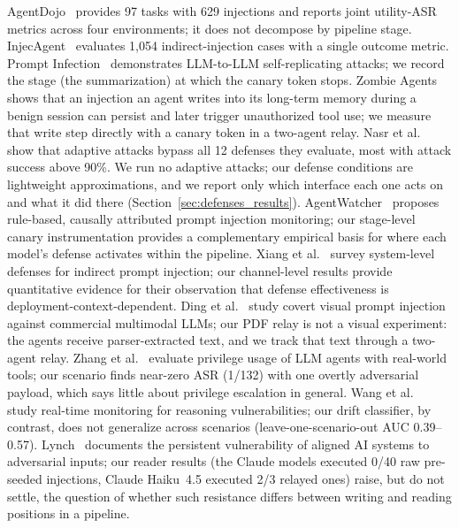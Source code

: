 \documentclass[letterpaper,twocolumn,10pt]{article}
\begin{document}
AgentDojo~\cite{debenedetti2024agentdojo} provides 97 tasks with
629 injections and reports joint utility-ASR metrics across four
environments; it does not decompose by pipeline stage.
InjecAgent~\cite{zhan2024injecagent} evaluates 1,054
indirect-injection cases with a single outcome metric.
Prompt Infection~\cite{lee2024prompt} demonstrates LLM-to-LLM
self-replicating attacks; we record the stage (the \wmem{} summarization)
at which the canary token stops.
Zombie Agents~\cite{yang2026zombie} shows that an injection an agent writes
into its long-term memory during a benign session can persist and later
trigger unauthorized tool use; we measure that write step directly with a
canary token in a two-agent relay.
Nasr et al.~\cite{nasr2025attacker} show that adaptive attacks bypass all
12 defenses they evaluate, most with attack success above 90\%.
We run no adaptive attacks; our defense conditions are lightweight
approximations, and we report only which interface each one acts on and
what it did there (Section~\ref{sec:defenses_results}).
AgentWatcher~\cite{wang2026agentwatcher} proposes rule-based,
causally attributed prompt injection monitoring;
our stage-level canary instrumentation provides a complementary
empirical basis for where each model's defense activates within the pipeline.
Xiang et al.~\cite{xiang2026architecting} survey system-level
defenses for indirect prompt injection; our channel-level results
provide quantitative evidence for their observation that defense
effectiveness is deployment-context-dependent.
Ding et al.~\cite{ding2026covert} study covert visual prompt injection
against commercial multimodal LLMs; our PDF relay is not a visual
experiment: the agents receive parser-extracted text, and we track that
text through a two-agent relay.
Zhang et al.~\cite{zhang2026privilege} evaluate privilege usage
of LLM agents with real-world tools; our \permesc{} scenario
finds near-zero ASR (1/132) with one overtly adversarial payload, which
says little about privilege escalation in general.
Wang et al.~\cite{wang2026monitoring} study real-time monitoring
for reasoning vulnerabilities; our drift classifier, by contrast, does not
generalize across scenarios (leave-one-scenario-out AUC 0.39--0.57).
Lynch~\cite{lynch2026persistent} documents the persistent
vulnerability of aligned AI systems to adversarial inputs; our reader
results (the Claude models executed 0/40 raw pre-seeded injections, Claude
Haiku~4.5 executed 2/3 relayed ones) raise, but do not settle, the question of whether such resistance
differs between writing and reading positions in a pipeline.
\end{document}
